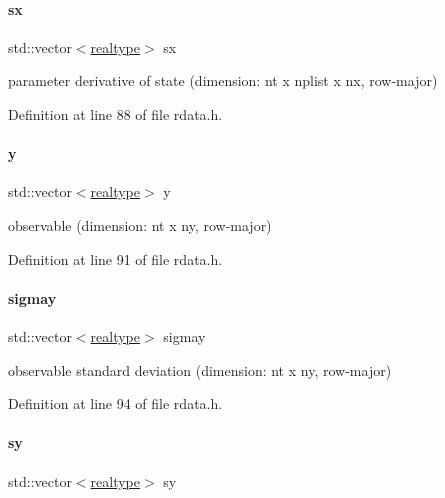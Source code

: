 \paragraph{\texorpdfstring{sx}{sx}}
{\footnotesize\ttfamily std\+::vector$<$\mbox{\hyperlink{namespaceamici_a1bdce28051d6a53868f7ccbf5f2c14a3}{realtype}}$>$ sx}

parameter derivative of state (dimension\+: nt x nplist x nx, row-\/major) 

Definition at line 88 of file rdata.\+h.

\mbox{\label{classamici_1_1_return_data_accf479492e699cb5e931c2a698148924}} 
\paragraph{\texorpdfstring{y}{y}}
{\footnotesize\ttfamily std\+::vector$<$\mbox{\hyperlink{namespaceamici_a1bdce28051d6a53868f7ccbf5f2c14a3}{realtype}}$>$ y}

observable (dimension\+: nt x ny, row-\/major) 

Definition at line 91 of file rdata.\+h.

\mbox{\label{classamici_1_1_return_data_a7dc280c0479f4a1fffe67fea251c26d2}} 
\paragraph{\texorpdfstring{sigmay}{sigmay}}
{\footnotesize\ttfamily std\+::vector$<$\mbox{\hyperlink{namespaceamici_a1bdce28051d6a53868f7ccbf5f2c14a3}{realtype}}$>$ sigmay}

observable standard deviation (dimension\+: nt x ny, row-\/major) 

Definition at line 94 of file rdata.\+h.

\mbox{\label{classamici_1_1_return_data_afae9aa5147266c51f0ac5004f1cdfbe0}} 
\paragraph{\texorpdfstring{sy}{sy}}
{\footnotesize\ttfamily std\+::vector$<$\mbox{\hyperlink{namespaceamici_a1bdce28051d6a53868f7ccbf5f2c14a3}{realtype}}$>$ sy}

